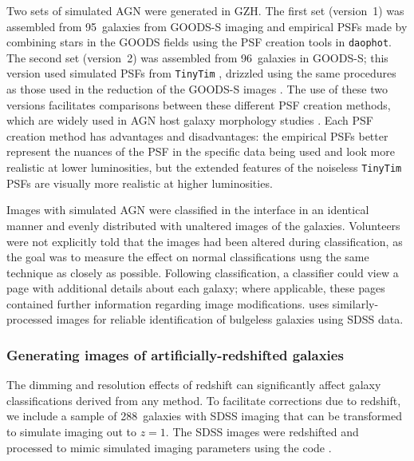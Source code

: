 \documentclass[twocolumn]{aastex6}
\begin{document}
Two sets of simulated AGN were generated in GZH. The first set (version~1) was
assembled from 95~galaxies from GOODS-S imaging and empirical PSFs made by
combining stars in the GOODS fields using the PSF creation tools in
\texttt{daophot}.  The second set (version~2) was assembled from 96~galaxies in
GOODS-S; this version used simulated PSFs from \texttt{TinyTim} \citep{kri93},
drizzled using the same procedures as those used in the reduction of the GOODS-S
images \citep{koe02,koe03,gia04}. The use of these two versions facilitates
comparisons between these different PSF creation methods, which are widely used
in AGN host galaxy morphology studies
\citep[e.g.,][]{san04,sim08,pie10a,simm11}.  Each PSF creation method has
advantages and disadvantages: the empirical PSFs better represent the nuances
of the PSF in the specific data being used and look more realistic at lower
luminosities, but the extended features of the noiseless \texttt{TinyTim} PSFs
are visually more realistic at higher luminosities.

Images with simulated AGN were classified in the interface in an identical
manner and evenly distributed with unaltered images of the galaxies.
Volunteers were not explicitly told that the images had been altered during
classification, as the goal was to measure the effect on normal classifications
usng the same technique as closely as possible. Following classification, a
classifier could view a page with additional details about each galaxy; where
applicable, these pages contained further information regarding image
modifications. \citet{sim14} uses similarly-processed images for reliable
identification of bulgeless galaxies using SDSS data.


\subsubsection{Generating images of artificially-redshifted galaxies}\label{ssec:ferengi}

The dimming and resolution effects of redshift can significantly affect galaxy
classifications derived from any method. To facilitate corrections due to
redshift, we include a sample of 288~galaxies with SDSS imaging that can be
transformed to simulate \hst{} imaging out to $z = 1$. 
The SDSS images were redshifted and processed to mimic simulated \hst{} imaging 
parameters using the \ferengi{} code \citep{bar08a}.

 
\end{document}
